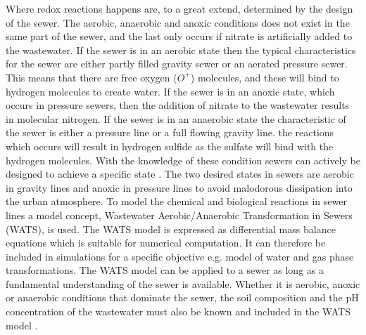 Where redox reactions happens are, to a great extend, determined by the design of the sewer. The aerobic, anaerobic and anoxic conditions does not exist in the same part of the sewer, and the last only occurs if nitrate is artificially added to the wastewater. If the sewer is in an aerobic state then the typical characteristics for the sewer are either partly filled gravity sewer or an aerated pressure sewer. This means that there are free oxygen ($O^+$) molecules, and these will bind to hydrogen molecules to create water. If the sewer is in an anoxic state, which occurs in pressure sewers, then the addition of nitrate to the wastewater results in molecular nitrogen. If the sewer is in an anaerobic state the characteristic of the sewer is either a pressure line or a full flowing gravity line. the reactions which occurs will result in hydrogen sulfide as the sulfate will bind with the hydrogen molecules. With the knowledge of these condition sewers can actively be designed to achieve a specific state \cite{Sewer_processes}. The two desired states in sewers are aerobic in gravity lines and anoxic in pressure lines to avoid malodorous dissipation into the urban atmosphere.
To model the chemical and biological reactions in sewer lines a model concept, Wastewater Aerobic/Anaerobic Transformation in Sewers (WATS), is used. The WATS model is expressed as differential mass balance equations which is suitable for numerical computation. It can therefore be included in simulations for a specific objective e.g. model of water and gas phase transformations. The WATS model can be applied to a sewer as long as a fundamental understanding of the sewer is available. Whether it is aerobic, anoxic or anaerobic conditions that dominate the sewer, the soil composition and the pH concentration of the wastewater must also be known and included in the WATS model \cite{Sewer_processes}.     




